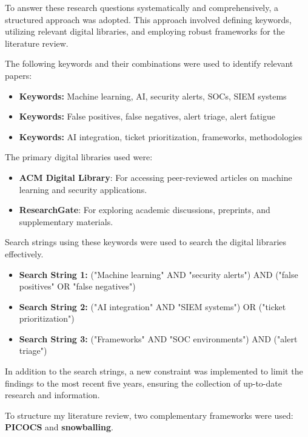 To answer these research questions systematically and comprehensively, a structured approach was adopted. 
This approach involved defining keywords, utilizing relevant digital libraries, and employing robust frameworks for the literature review.

The following keywords and their combinations were used to identify relevant papers:
\begin{itemize}
    \item \textbf{Keywords:} Machine learning, AI, security alerts, SOCs, SIEM systems
    \item \textbf{Keywords:} False positives, false negatives, alert triage, alert fatigue
    \item \textbf{Keywords:} AI integration, ticket prioritization, frameworks, methodologies
\end{itemize}

The primary digital libraries used were:
\begin{itemize}
    \item \textbf{ACM Digital Library}: For accessing peer-reviewed articles on machine learning and security applications.
    \item \textbf{ResearchGate}: For exploring academic discussions, preprints, and supplementary materials.
\end{itemize}

Search strings using these keywords were used to search the digital libraries effectively.
\begin{itemize}
    \item \textbf{Search String 1:} ("Machine learning" AND "security alerts") AND ("false positives" OR "false negatives")
    \item \textbf{Search String 2:} ("AI integration" AND "SIEM systems") OR ("ticket prioritization")
    \item \textbf{Search String 3:} ("Frameworks" AND "SOC environments") AND ("alert triage")
\end{itemize}

In addition to the search strings, a new constraint was implemented to limit the findings to the most recent five years, ensuring the collection of up-to-date research and information.

To structure my literature review, two complementary frameworks were used: \textbf{PICOCS} and \textbf{snowballing}.

